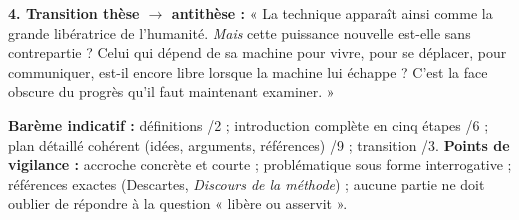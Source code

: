 \documentclass[11pt]{article}
\begin{document}
\begin{corrige}
\textbf{4. Transition thèse $\rightarrow$ antithèse :} « La technique apparaît ainsi comme la grande libératrice de l'humanité. \emph{Mais} cette puissance nouvelle est-elle sans contrepartie ? Celui qui dépend de sa machine pour vivre, pour se déplacer, pour communiquer, est-il encore libre lorsque la machine lui échappe ? C'est la face obscure du progrès qu'il faut maintenant examiner. »

\textbf{Barème indicatif :} définitions /2 ; introduction complète en cinq étapes /6 ; plan détaillé cohérent (idées, arguments, références) /9 ; transition /3.
\textbf{Points de vigilance :} accroche concrète et courte ; problématique sous forme interrogative ; références exactes (Descartes, \emph{Discours de la méthode}) ; aucune partie ne doit oublier de répondre à la question « libère ou asservit ».
\end{corrige}
\end{document}
